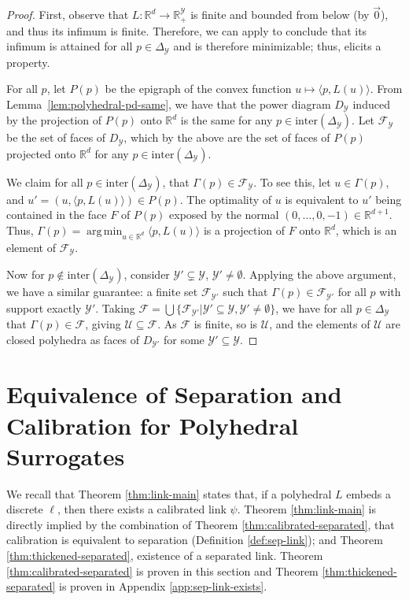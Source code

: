 \documentclass[11pt]{article}
\newcommand{\reals}{\mathbb{R}}
\newcommand{\simplex}{\Delta_\Y}
\newcommand{\F}{\mathcal{F}}
\newcommand{\U}{\mathcal{U}}
\newcommand{\Y}{\mathcal{Y}}
\newcommand{\inprod}[2]{\langle #1, #2 \rangle}%
\newcommand{\inter}{\mathrm{inter}}
\DeclareMathOperator*{\argmin}{arg\,min}
\begin{document}
\polyhedralrangegamma*
\begin{proof}
	First, observe that $L: \reals^d \to \reals^\Y_+$ is finite and bounded from below (by $\vec 0$), and thus its infimum is finite. 
	Therefore, we can apply \citet[Corollary 19.3.1]{rockafellar1997convex} to conclude that its infimum is attained for all $p \in \simplex$ and is therefore minimizable; thus, elicits a property.
	
	For all $p$, let $P(p)$ be the epigraph of the convex function $u\mapsto \inprod{p}{L(u)}$.
	From Lemma~\ref{lem:polyhedral-pd-same}, we have that the power diagram $D_\Y$ induced by the projection of $P(p)$ onto $\reals^d$ is the same for any $p\in\inter(\simplex)$.
	Let $\F_\Y$ be the set of faces of $D_\Y$, which by the above are the set of faces of $P(p)$ projected onto $\reals^d$ for any $p\in\inter(\simplex)$.
	
	We claim for all $p\in\inter(\simplex)$, that $\Gamma(p) \in \F_\Y$.
	To see this, let $u \in \Gamma(p)$, and $u' = (u,\inprod{p}{L(u)}) \in P(p)$.
	The optimality of $u$ is equivalent to $u'$ being contained in the face $F$ of $P(p)$ exposed by the normal $(0,\ldots,0,-1)\in\reals^{d+1}$.
	Thus, $\Gamma(p) = \argmin_{u\in\reals^d} \inprod{p}{L(u)}$ is a projection of $F$ onto $\reals^d$, which is an element of $\F_\Y$.
	
	Now for $p \not \in \inter(\simplex)$, consider $\Y'\subsetneq \Y$, $\Y'\neq\emptyset$.
	Applying the above argument, we have a similar guarantee: a finite set $\F_{\Y'}$ such that $\Gamma(p) \in \F_{\Y'}$ for all $p$ with support exactly $\Y'$.
	Taking $\F = \bigcup\{\F_{\Y'} | \Y'\subseteq\Y, \Y'\neq\emptyset\}$, we have for all $p\in\simplex$ that $\Gamma(p) \in \F$, giving $\U \subseteq \F$.
	As $\F$ is finite, so is $\U$, and the elements of $\U$ are closed polyhedra as faces of $D_{\Y'}$ for some $\Y'\subseteq\Y$.
\end{proof}






\section{Equivalence of Separation and Calibration for Polyhedral Surrogates}
\label{sec:equiv-sep-calib}

We recall that Theorem \ref{thm:link-main} states that, if a polyhedral $L$ embeds a discrete $\ell$, then there exists a calibrated link $\psi$.
Theorem \ref{thm:link-main} is directly implied by the combination of Theorem \ref{thm:calibrated-separated}, that calibration is equivalent to separation (Definition \ref{def:sep-link}); and Theorem \ref{thm:thickened-separated}, existence of a separated link.
Theorem \ref{thm:calibrated-separated} is proven in this section and Theorem \ref{thm:thickened-separated} is proven in Appendix \ref{app:sep-link-exists}.
\end{document}
